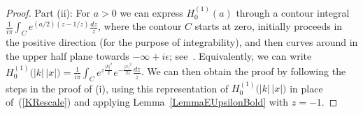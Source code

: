 \documentclass[10pt]{article}
\numberwithin{equation}{section}
\theoremstyle{definition}
\begin{document}
\begin{appendix}
\begin{proof}
\noindent Part (ii): For $a>0 $ we can express $H_0^{(1)}(a)$ through a contour integral $\frac{1}{i\pi}\int_{C}e^{(a/2)(z-1/z)} \frac{dz}{z} $, where the contour $C$ starts at zero, initially proceeds in the positive direction (for the purpose of integrability), and then curves around in the upper half plane towards $-\infty+i\epsilon$; see~\cite[Fig.\ 12.9 \& (12.97)]{Weber}.  Equivalently, we can  write $  H_0^{(1)}\big(|k|\,|x| \big)=\frac{1}{i\pi}\int_{C}e^{z\frac{|k|^2}{2}  } e^{ -\frac{|x|^2}{2z}  }  \frac{dz}{z}  $.  We can then obtain the proof by following the steps in the proof of (i), using this representation of $ H_0^{(1)}\big(|k|\,|x| \big)$  in place of~(\ref{KRescale}) and applying Lemma~\ref{LemmaEUpsilonBold} with $z=-1$.
\end{proof}




\end{appendix}
\end{document}
